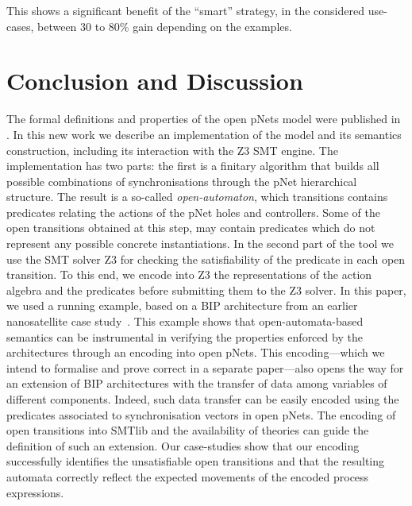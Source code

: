 \documentclass[smallcondensed]{svjour3}
\newcommand{\mdash}{---}
\begin{document}
        This shows a significant benefit of the ``smart'' strategy, in the considered use-cases, between 30 to 80\% gain depending on the examples.

\section{Conclusion and Discussion}
\label{section:conclusion}

The formal definitions and properties of the open pNets model were
published in \cite{henrio:Forte2016}. In this new work we describe an implementation of
the model and its semantics construction, including its interaction
with the Z3 SMT engine.
The implementation has two parts: the first is a finitary algorithm
that builds all possible combinations of synchronisations through the
pNet hierarchical structure. The result is a so-called
\emph{open-automaton}, which transitions contains predicates relating
the actions of the pNet holes and controllers. Some of the open
transitions obtained at this step,  may
contain predicates which do not represent any possible concrete
instantiations. 
In the second part of the tool we use the SMT solver Z3 for checking the
satisfiability of the predicate in each open transition. 
To this end, we encode into Z3 the representations of the action algebra and
the predicates before submitting them to the
Z3 solver. 
%
%
In this paper, we used a running example, based on a BIP
architecture from an earlier nanosatellite case
study~\cite{CubETH-case-study}.  This example shows that
open-automata-based semantics can be instrumental in verifying the
properties enforced by the architectures through an encoding into open
pNets.  This encoding\mdash which we intend to formalise and prove
correct in a separate paper\mdash also opens the way for an extension
of BIP architectures with the transfer of data among variables of
different components.  Indeed, such data transfer can be easily
encoded using the predicates associated to synchronisation vectors in
open pNets.  The encoding of open transitions into SMTlib and the
availability of theories can guide the definition of such an extension.
%
%
Our case-studies show that our encoding
successfully identifies the unsatisfiable open transitions and that
the resulting automata correctly reflect the expected 
movements of the encoded process expressions.   
\end{document}
